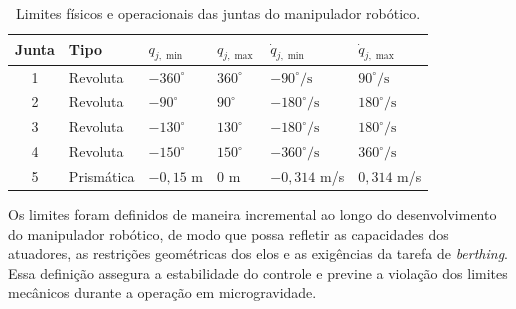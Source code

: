 \setlength{\tabcolsep}{14pt} 
\renewcommand{\arraystretch}{1}
\begin{table}[ht]
\centering
\caption{Limites físicos e operacionais das juntas do manipulador robótico.}
\label{tab:limites_juntasPosVelocidade}
\begin{tabular}{clllll}
\toprule
\textbf{Junta} & \textbf{Tipo} & $q_{j,\min}$ & $q_{j,\max}$ & $\dot{q}_{j,\min}$ & $\dot{q}_{j,\max}$ \\
\midrule
1 & Revoluta & $-360^\circ$ & $360^\circ$ & $-90^\circ/\text{s}$ & $90^\circ/\text{s}$ \\
2 & Revoluta & $-90^\circ$ & $90^\circ$ & $-180^\circ/\text{s}$ & $180^\circ/\text{s}$ \\
3 & Revoluta & $-130^\circ$ & $130^\circ$ & $-180^\circ/\text{s}$ & $180^\circ/\text{s}$ \\
4 & Revoluta & $-150^\circ$ & $150^\circ$ & $-360^\circ/\text{s}$ & $360^\circ/\text{s}$ \\
5 & Prismática & $-0{,}15$ m & $0$ m & $-0{,}314$ m/s & $0{,}314$ m/s \\
\bottomrule
\end{tabular}
\end{table}

Os limites foram definidos de maneira incremental ao longo do desenvolvimento do manipulador robótico, de modo que possa refletir as capacidades dos atuadores, as restrições geométricas dos elos e as exigências da tarefa de \emph{berthing}.
Essa definição assegura a estabilidade do controle e previne a violação dos limites mecânicos durante a operação em microgravidade.




